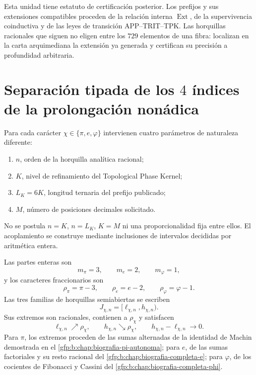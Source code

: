 
\label{gfp:b:chap:precision-arbitraria-constantes}

Esta unidad tiene estatuto de certificación posterior. Los prefijos y sus
extensiones compatibles proceden de la relación interna
\(\operatorname{Ext}\), de la supervivencia coinductiva y de las leyes de
transición APP--TRIT--TPK. Las horquillas racionales que siguen no eligen
entre los \(729\) elementos de una fibra: localizan en la carta arquimediana
la extensión ya generada y certifican su precisión a profundidad arbitraria.

\section{Separación tipada de los \(4\) índices de la prolongación nonádica}

Para cada carácter \(\chi\in\{\pi,e,\varphi\}\) intervienen cuatro
parámetros de naturaleza diferente:
\begin{enumerate}
 \item \(n\), orden de la horquilla analítica racional;
 \item \(K\), nivel de refinamiento del Topological Phase Kernel;
 \item \(L_K=6K\), longitud ternaria del prefijo publicado;
 \item \(M\), número de posiciones decimales solicitado.
\end{enumerate}
No se postula \(n=K\), \(n=L_K\), \(K=M\) ni una proporcionalidad fija
entre ellos. El acoplamiento se construye mediante inclusiones de intervalos
decididas por aritmética entera.

Las partes enteras son
\[
 m_\pi=3,
 \qquad
 m_e=2,
 \qquad
 m_\varphi=1,
\]
y los caracteres fraccionarios son
\[
 \rho_\pi=\pi-3,
 \qquad
 \rho_e=e-2,
 \qquad
 \rho_\varphi=\varphi-1.
\]
Las tres familias de horquillas semiabiertas se escriben
\[
 J_{\chi,n}=[\ell_{\chi,n},h_{\chi,n}).
\]
Sus extremos son racionales, contienen a \(\rho_\chi\) y satisfacen
\[
 \ell_{\chi,n}\nearrow\rho_\chi,
 \qquad
 h_{\chi,n}\searrow\rho_\chi,
 \qquad
 h_{\chi,n}-\ell_{\chi,n}\longrightarrow0.
\]
Para \(\pi\), los extremos proceden de las sumas alternadas de la identidad
de Machin demostrada en el \cref{gfp:b:chap:biografia-pi-autonoma}; para \(e\),
de las sumas factoriales y su resto racional del
\cref{gfp:b:chap:biografia-completa-e}; para \(\varphi\), de los cocientes de
Fibonacci y Cassini del \cref{gfp:b:chap:biografia-completa-phi}.

